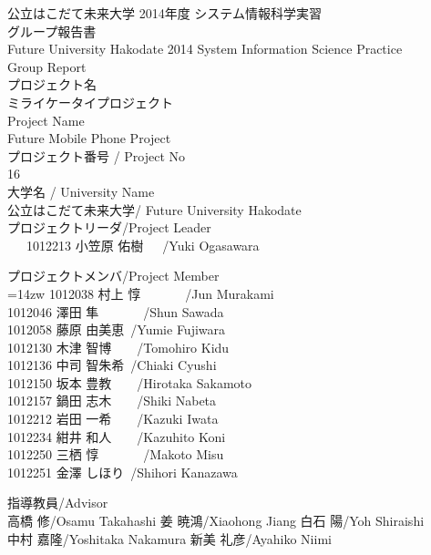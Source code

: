 \begin{center}
{\Large 公立はこだて未来大学 2014年度 システム情報科学実習\\[-1mm]グループ報告書\\[2mm] Future University Hakodate 2014 System Information Science Practice\\ [-1mm]Group Report\\[10mm]}
{\large プロジェクト名\\[-1mm]ミライケータイプロジェクト\\[1mm]Project Name\\[-1mm]Future Mobile Phone Project}\\[10mm]
プロジェクト番号 / Project No\\
16\\[10mm]
{\normalsize 大学名 / University Name\\[-1mm]公立はこだて未来大学/ Future University Hakodate}\\[5mm]
{\normalsize プロジェクトリーダ/Project Leader}\\[-1mm]
\ \ \ 1012213 小笠原 佑樹\ \ \ /Yuki Ogasawara\\[10mm]
\begin{center}
プロジェクトメンバ/Project Member\\
\leftskip=14zw
1012038 村上 惇\ \ \ \ \ \ \ /Jun Murakami\\
1012046 澤田 隼\ \ \ \ \ \ \ /Shun Sawada\\
1012058 藤原 由美恵\ /Yumie Fujiwara\\
1012130 木津 智博\ \ \ \ /Tomohiro Kidu\\
1012136 中司 智朱希\ /Chiaki Cyushi\\
1012150 坂本 豊教\ \ \ \ /Hirotaka Sakamoto\\
1012157 鍋田 志木\ \ \ \ /Shiki Nabeta\\
1012212 岩田 一希\ \ \ \ /Kazuki Iwata\\
1012234 紺井 和人\ \ \ \ /Kazuhito Koni\\
1012250 三栖 惇\ \ \ \ \ \ \ /Makoto Misu\\
1012251 金澤 しほり\ /Shihori Kanazawa\\
[10mm]
\end{center}
指導教員/Advisor\\
高橋 修/Osamu Takahashi
姜 暁鴻/Xiaohong Jiang 
白石 陽/Yoh Shiraishi\\
中村 嘉隆/Yoshitaka Nakamura
新美 礼彦/Ayahiko Niimi\\


\end{center}
